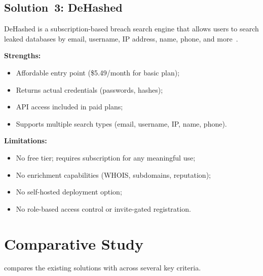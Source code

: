 \subsection{Solution~3: DeHashed}

DeHashed is a subscription-based breach search engine that allows users to
search leaked databases by email, username, IP address, name, phone, and
more~\cite{dehashed}.

\textbf{Strengths:}
\begin{itemize}[nosep]
  \item Affordable entry point (\$5.49/month for basic plan);
  \item Returns actual credentials (passwords, hashes);
  \item API access included in paid plans;
  \item Supports multiple search types (email, username, IP, name, phone).
\end{itemize}

\textbf{Limitations:}
\begin{itemize}[nosep]
  \item No free tier; requires subscription for any meaningful use;
  \item No enrichment capabilities (WHOIS, subdomains, reputation);
  \item No self-hosted deployment option;
  \item No role-based access control or invite-gated registration.
\end{itemize}

\section{Comparative Study}
\label{sec:comparative}

 compares the existing solutions with \leaklens{}
across several key criteria.

